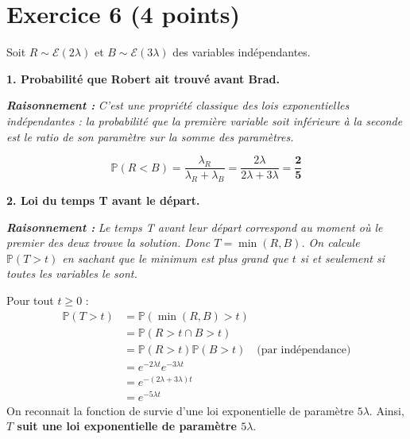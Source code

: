 \documentclass[11pt,a4paper]{article}
\newcommand{\raisonnement}[1]{
    \vspace{0.2cm}
    \noindent\textcolor{blue!70!black}{
        \textbf{\textit{Raisonnement : }} \textit{#1}
    }
    \vspace{0.2cm}
}
\begin{document}
\vspace{0.5cm}
\section*{Exercice 6 (4 points)}

Soit $R \sim \mathcal{E}(2\lambda)$ et $B \sim \mathcal{E}(3\lambda)$ des variables indépendantes.

\textbf{1. Probabilité que Robert ait trouvé avant Brad.}
\raisonnement{C'est une propriété classique des lois exponentielles indépendantes : la probabilité que la première variable soit inférieure à la seconde est le ratio de son paramètre sur la somme des paramètres.}
$$ \mathbb{P}(R < B) = \frac{\lambda_R}{\lambda_R + \lambda_B} = \frac{2\lambda}{2\lambda + 3\lambda} = \mathbf{\frac{2}{5}} $$

\textbf{2. Loi du temps T avant le départ.}
\raisonnement{Le temps T avant leur départ correspond au moment où le \textit{premier} des deux trouve la solution. Donc $T = \min(R, B)$. On calcule $\mathbb{P}(T > t)$ en sachant que le minimum est plus grand que $t$ si et seulement si toutes les variables le sont.}
Pour tout $t \ge 0$ :
\begin{align*}
\mathbb{P}(T > t) &= \mathbb{P}(\min(R, B) > t) \\
&= \mathbb{P}(R > t \cap B > t) \\
&= \mathbb{P}(R > t)\mathbb{P}(B > t) \quad \text{(par indépendance)} \\
&= e^{-2\lambda t} e^{-3\lambda t} \\
&= e^{-(2\lambda + 3\lambda)t} \\
&= e^{-5\lambda t}
\end{align*}
On reconnait la fonction de survie d'une loi exponentielle de paramètre $5\lambda$.
Ainsi, \textbf{$T$ suit une loi exponentielle de paramètre $5\lambda$}.
\end{document}
